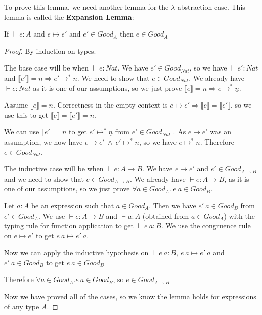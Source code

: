 To prove this lemma, we need another lemma for the $\lambda$-abstraction case. This lemma is called the \textbf{Expansion Lemma}:

\vspace{0.5cm}

\begin{lem}
If $ \vdash e : A$ and $e \mapsto e'$ and $e' \in Good_A$ then $e \in Good_A$
\end{lem}

\begin{proof}
By induction on types.

The base case will be when $\vdash e :  Nat$.  We have $e' \in Good_{Nat}$, so we have $\vdash e' : Nat$ and $\llbracket e' \rrbracket = n \Rightarrow e' \mapsto^* \underline{n}$. We need to show that $e \in Good_{Nat}$. We already have $\vdash e : Nat$ as it is one of our assumptions, so we just prove $\llbracket e \rrbracket = n \Rightarrow e \mapsto^* \underline{n}$.

Assume $\llbracket e \rrbracket = n$. Correctness in the empty context is $e \mapsto e' \Rightarrow \llbracket e \rrbracket = \llbracket e' \rrbracket$, so we use this to get $\llbracket e \rrbracket = \llbracket e' \rrbracket = n$. 

We can use $\llbracket e' \rrbracket = n$ to get $e' \mapsto^* \underline{n}$ from $e' \in Good_{Nat}$ . As $e \mapsto e'$ was an assumption, we now have $e \mapsto e' \ \wedge \ e' \mapsto^* \underline{n}$, so we have $e \mapsto^* \underline{n}$. Therefore $e \in Good_{Nat}$.

\vspace{0.5cm}

The inductive case will be when $\vdash e : A \to B$. We have $e \mapsto e'$ and $e' \in Good_{A \to B}$ and we need to show that $e \in Good_{A \to B}$. We already have $\vdash e : A \to B$, as it is one of our assumptions, so we just prove $\forall a \in Good_A. \ e \ a \in Good_B$.

Let $a : A$ be an expression such that $a \in Good_A$. Then we have $e' \ a \in Good_B$ from $e' \in Good_A$. We use $\vdash e : A \to B$ and $\vdash a : A$ (obtained from $a \in Good_A$) with the typing rule for function application to get $\vdash e \ a : B$. We use the congruence rule on $e \mapsto e'$ to get $e \ a \mapsto e' \ a$. 

Now we can apply the inductive hypothesis on $\vdash e \ a : B$, $e \ a \mapsto e' \ a$ and $e' \ a \in Good_B$ to get $e \ a \in Good_B$

Therefore $\forall a \in Good_A. e \ a \in Good_B$, so $e \in Good_{A \to B}$

Now we have proved all of the cases, so we know the lemma holds for expressions of any type $A$.

\end{proof}

